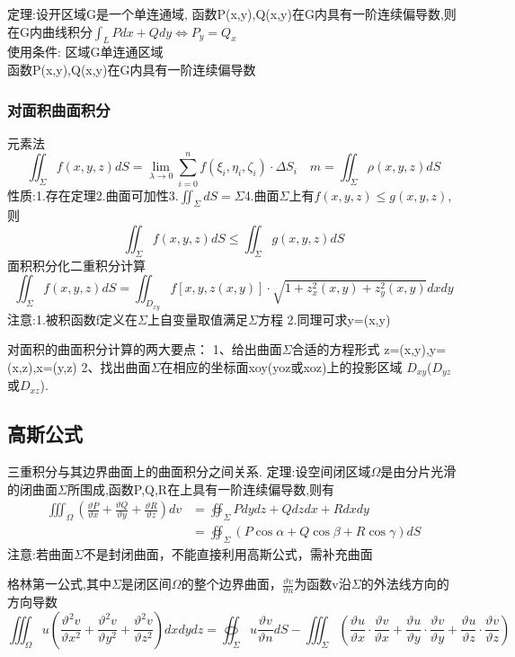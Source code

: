 \documentclass[10pt, a4paper, oneside]{ctexart}
\begin{document}
\begin{sloppypar}
	定理:设开区域G是一个单连通域, 函数P(x,y),Q(x,y)在G内具有一阶连续偏导数,则在G内曲线积分$\int_LPdx+Qdy\Leftrightarrow P_y=Q_x$\\
	使用条件:
	区域G单连通区域\\
	函数P(x,y),Q(x,y)在G内具有一阶连续偏导数
	\subsubsection{对面积曲面积分}
	元素法$$
		\iint_\Sigma f(x,y,z)dS = \lim_{\lambda\to 0}\sum_{i=0}^{n}f(\xi_i,\eta_i,\zeta_i)\cdot\Delta S_i \quad m = \iint_\Sigma \rho (x,y,z)dS$$
	性质:1.存在定理2.曲面可加性3.$\iint_\Sigma dS = \Sigma$4.曲面$\Sigma$上有$f(x,y,z)\leq g(x,y,z)$,则$$
		\iint_\Sigma f(x,y,z)dS \leq \iint_\Sigma g(x,y,z)dS
	$$
	面积积分化二重积分计算$$
		\iint_\Sigma f(x,y,z)dS = \iint_{D_{xy}} f[x,y,z(x,y)]\cdot \sqrt{1+z_x^2(x,y)+z_y^2(x,y)}dxdy
	$$注意:1.被积函数f定义在$\Sigma$上自变量取值满足$\Sigma$方程
	2.同理可求y=(x,y)

	对面积的曲面积分计算的两大要点：
	1、给出曲面$\Sigma$合适的方程形式
	z=(x,y),y=(x,z),x=(y,z)
	2、找出曲面$\Sigma$在相应的坐标面xoy(yoz或xoz)上的投影区域
	$D_{xy}$($D_{yz}$或$D_{xz}$).
	\subsection{高斯公式}
	三重积分与其边界曲面上的曲面积分之间关系.
	定理:设空间闭区域$\Omega $是由分片光滑的闭曲面$\Sigma$所围成,函数P,Q,R在上具有一阶连续偏导数,则有
	\begin{equation}\label{eq4}
		\begin{split}
			\iiint_\Omega (\frac{\vartheta P}{\vartheta x} + \frac{\vartheta Q}{\vartheta y}+\frac{\vartheta R}{\vartheta z})dv &= \oiint_\Sigma Pdydz + Qdzdx + Rdxdy
			\\&= \oiint_\Sigma (P\cos\alpha + Q\cos\beta + R\cos\gamma)dS
		\end{split}
	\end{equation}
	注意:若曲面$\Sigma$不是封闭曲面，不能直接利用高斯公式，需补充曲面

	格林第一公式,其中$\Sigma$是闭区间$\Omega$的整个边界曲面，$\frac{\vartheta v}{\vartheta n}$为函数v沿$\Sigma$的外法线方向的方向导数$$
		\iiint_\Omega u (\frac{\vartheta^2 v}{\vartheta x^2 }+\frac{\vartheta^2 v}{\vartheta y^2 }+\frac{\vartheta^2 v}{\vartheta z^2 })dxdydz = \oiint_\Sigma u \frac{\vartheta v}{\vartheta n }dS - \iiint_\Sigma (\frac{\vartheta u}{\vartheta x} \cdot \frac{\vartheta v}{\vartheta x}+\frac{\vartheta u}{\vartheta y} \cdot\frac{\vartheta v}{\vartheta y}+\frac{\vartheta u}{\vartheta z} \cdot \frac{\vartheta v}{\vartheta z})
	$$


\end{sloppypar}
\end{document}
